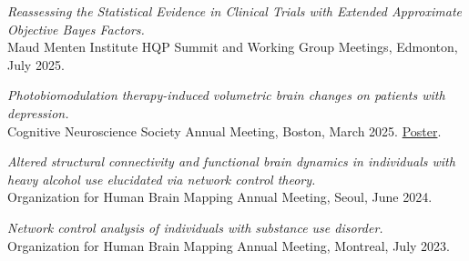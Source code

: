 \documentclass[9pt]{extarticle}
\begin{document}
{\textit{Reassessing the Statistical Evidence in Clinical Trials with Extended Approximate Objective Bayes Factors.}\\
Maud Menten Institute HQP Summit and Working Group Meetings, Edmonton, July 2025.\par\vspace{6pt}

\textit{Photobiomodulation therapy-induced volumetric brain changes on patients with depression.}\\
Cognitive Neuroscience Society Annual Meeting, Boston, March 2025.
\href{https://punnettsquare9331.github.io/posters/volumetric-changes-cns-2025.pdf}{Poster}.\par\vspace{6pt}

\textit{Altered structural connectivity and functional brain dynamics in individuals with heavy alcohol use elucidated via network control theory.}\\
Organization for Human Brain Mapping Annual Meeting, Seoul, June 2024.\par\vspace{6pt}

\textit{Network control analysis of individuals with substance use disorder.}\\
Organization for Human Brain Mapping Annual Meeting, Montreal, July 2023.\par
}
\end{document}
